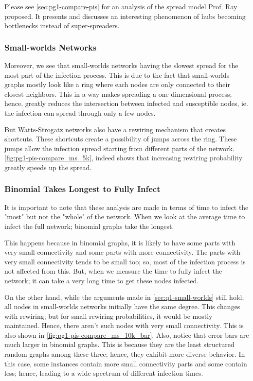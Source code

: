\documentclass[conference]{IEEEtran}
\begin{document}
Please see \autoref{sec:pg1-compare-pis} for an analysis of the spread model Prof. Ray proposed. It presents and discusses an interesting phenomenon of hubs becoming bottlenecks instead of super-spreaders.

\subsubsection{Small-worlds Networks}\label{sec:q1-small-worlds}

Moreover, we see that small-worlds networks having the slowest spread for the most part of the infection process. This is due to the fact that small-worlds graphs mostly look like a ring where each nodes are only connected to their closest neighbors. This in a way makes spreading a one-dimensional process; hence, greatly reduces the intersection between infected and susceptible nodes, ie. the infection can spread through only a few nodes.

But Watts-Strogatz networks also have a rewiring mechanism that creates shortcuts. These shortcuts create a possibility of jumps across the ring. These jumps allow the infection spread starting from different parts of the network. \autoref{fig:pg1-pis-compare_ms_5k}, indeed shows that increasing rewiring probability greatly speeds up the spread.


\subsubsection{Binomial Takes Longest to Fully Infect}\label{sec:binomial takes longest}

It is important to note that these analysis are made in terms of time to infect the "most" but not the "whole" of the network. When we look at the average time to infect the full network; binomial graphs take the longest.

This happens because in binomial graphs, it is likely to have some parts with very small connectivity and some parts with more connectivity. The parts with very small connectivity tends to be small too; so, most of the infection process is not affected from this. But, when we measure the time to fully infect the network; it can take a very long time to get these nodes infected.

On the other hand, while the arguments made in \autoref{sec:q1-small-worlds} still hold; all nodes in small-worlds networks initially have the same degree. This changes  with rewiring; but for small rewiring probabilities, it would be mostly maintained. Hence, there aren't such nodes with very small connectivity. This is also shown in \autoref{fig:pg1-pis-compare_ms_10k_bar}. Also, notice that error bars are much larger in binomial graphs. This is because they are the least structured random graphs among these three; hence, they exhibit more diverse behavior. In this case, some instances contain more small connectivity parts and some contain less; hence, leading to a wide spectrum of different infection times.
\end{document}
